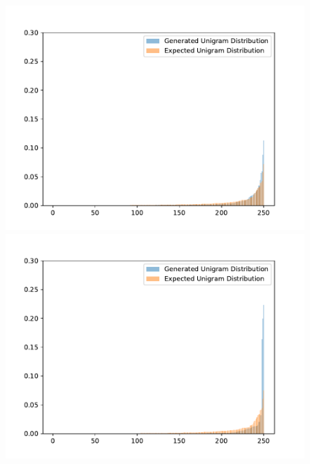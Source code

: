 \begin{figure}[H]
	\centering
	\small
	\endminipage\hfill
	\includegraphics[width=\linewidth]{img/plots/opensubtitles_not_reversed/unigram_distribution_comparison_step_1500000.pdf}
	\centering
	\small
	\endminipage\hfill
	\includegraphics[width=\linewidth]{img/plots/opensubtitles_not_reversed/unigram_distribution_comparison_step_2000000.pdf}
	\centering
	\small
	\endminipage\hfill

\end{figure}
